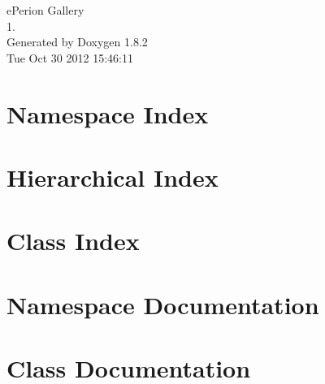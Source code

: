 \documentclass{book}
\begin{document}
\begin{titlepage}
\vspace*{7cm}
\begin{center}
{\Large e\-Perion Gallery \\[1ex]\large 1. }\\
\vspace*{1cm}
{\large Generated by Doxygen 1.8.2}\\
\vspace*{0.5cm}
{\small Tue Oct 30 2012 15:46:11}\\
\end{center}
\end{titlepage}
\clearemptydoublepage
{}
\tableofcontents
\clearemptydoublepage
{}
\chapter{Namespace Index}

\chapter{Hierarchical Index}

\chapter{Class Index}

\chapter{Namespace Documentation}




\chapter{Class Documentation}














\printindex
\end{document}
